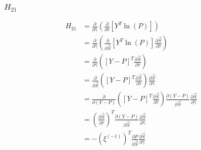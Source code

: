 \documentclass{article}
\begin{document}
\subsubsection{$H_{21}$}
\begin{equation}
\begin{aligned}
H_{21} &= \frac{\partial}{\partial \hat{\gamma}}  \left( \frac{\partial}{\partial \hat{\tau}}  \left[ Y^T \ln \left( P \right) \right] \right) 
\\
&= \frac{\partial}{\partial \hat{\gamma}}  \left( \frac{\partial}{\partial \vec{S}}  \left[ Y^T \ln \left( P \right) \right] \frac{\partial \vec{S}}{\partial \hat{\tau}} \right) 
\\
&= \frac{\partial}{\partial \hat{\gamma}}  \left( \left[ Y - P \right]^T \frac{\partial \vec{S}}{\partial \hat{\tau}} \right) 
\\
&= \frac{\partial}{\partial \vec{S}}  \left( \left[ Y - P \right]^T \frac{\partial \vec{S}}{\partial \hat{\tau}} \right) \frac{\partial \vec{S}}{\partial \hat{\gamma}} 
\\
&= \frac{\partial}{\partial \left( Y - P \right)}  \left( \left[ Y - P \right]^T \frac{\partial \vec{S}}{\partial \hat{\tau}} \right) \frac{\partial \left( Y - P \right)}{\partial \vec{S}} \frac{\partial \vec{S}}{\partial \hat{\gamma}} 
\\
&= \left( \frac{\partial \vec{S}}{\partial \hat{\tau}} \right)^T \frac{\partial \left( Y - P \right)}{\partial \vec{S}} \frac{\partial \vec{S}}{\partial \hat{\gamma}} 
\\
&= - \left( \xi^{(-1)} \right)^T \frac{\partial P}{\partial \vec{S}} \frac{\partial \vec{S}}{\partial \hat{\gamma}}
\end{aligned}
\end{equation}
\end{document}
